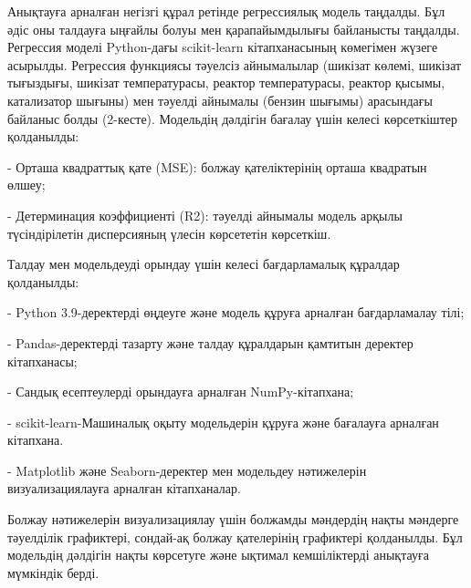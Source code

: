 Анықтауға арналған негізгі құрал ретінде регрессиялық модель таңдалды.
Бұл әдіс оны талдауға ыңғайлы болуы мен қарапайымдылығы байланысты
таңдалды. Регрессия моделі Python-дағы scikit-learn кітапханасының
көмегімен жүзеге асырылды. Регрессия функциясы тәуелсіз айнымалылар
(шикізат көлемі, шикізат тығыздығы, шикізат температурасы, реактор
температурасы, реактор қысымы, катализатор шығыны) мен тәуелді айнымалы
(бензин шығымы) арасындағы байланыс болды (2-кесте). Модельдің дәлдігін
бағалау үшін келесі көрсеткіштер қолданылды:

- Орташа квадраттық қате (MSE): болжау қателіктерінің орташа квадратын
өлшеу;

- Детерминация коэффициенті (R2): тәуелді айнымалы модель арқылы
түсіндірілетін дисперсияның үлесін көрсететін көрсеткіш.

Талдау мен модельдеуді орындау үшін келесі бағдарламалық құралдар
қолданылды:

- Python 3.9-деректерді өңдеуге және модель құруға арналған
бағдарламалау тілі;

- Pandas-деректерді тазарту және талдау құралдарын қамтитын деректер
кітапханасы;

- Сандық есептеулерді орындауға арналған NumPy-кітапхана;

- scikit-learn-Машиналық оқыту модельдерін құруға және бағалауға
арналған кітапхана.

- Matplotlib және Seaborn-деректер мен модельдеу нәтижелерін
визуализациялауға арналған кітапханалар.

Болжау нәтижелерін визуализациялау үшін болжамды мәндердің нақты
мәндерге тәуелділік графиктері, сондай-ақ болжау қателерінің графиктері
қолданылды. Бұл модельдің дәлдігін нақты көрсетуге және ықтимал
кемшіліктерді анықтауға мүмкіндік берді.

